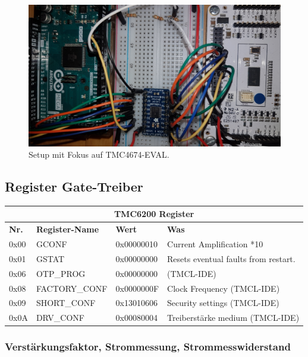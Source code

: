 \begin{figure}[H]
	\centering
	\includegraphics[angle = 180,width=\textwidth]{graphics/2_EVAL}
	\caption{Setup mit Fokus auf TMC4674-EVAL.}
	\label{fig:2_EVAL}
\end{figure}

\subsection{Register Gate-Treiber}\label{Appendix:TMC6200_Register}

\begin{table}[H]
\centering
\begin{tabular}{|l|l|l|l|}
\hline
\multicolumn{4}{|c|}{\textbf{TMC6200 Register}}          \\ \hline
\textbf{Nr.} & \textbf{Register-Name} & \textbf{Wert}       & \textbf{Was} \\ \hline
0x00         & GCONF         & 0x00000010 & Current Amplification *10    \\ \hline
0x01         & GSTAT         & 0x00000000 & Resets eventual faults from restart.    \\ \hline
0x06         & OTP\_PROG     & 0x00000000 & (TMCL-IDE)    \\ \hline
0x08         & FACTORY\_CONF & 0x0000000F & Clock Frequency (TMCL-IDE)    \\ \hline
0x09         & SHORT\_CONF   & 0x13010606 & Security settings (TMCL-IDE)    \\ \hline
0x0A         & DRV\_CONF     & 0x00080004 & Treiberstärke medium (TMCL-IDE)    \\ \hline
\end{tabular}
\end{table}

\subsubsection{Verstärkungsfaktor, Strommessung, Strommesswiderstand}\label{Appendix:Shunt}

